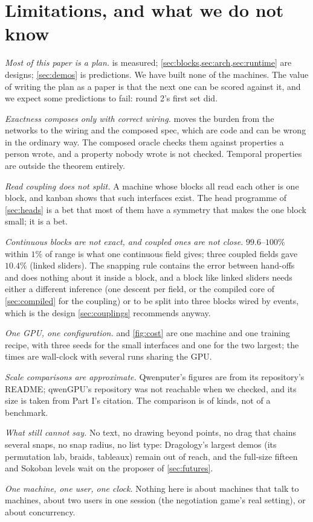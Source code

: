 \section{Limitations, and what we do not know}
\label{sec:limits}

\emph{Most of this paper is a plan.}  is measured; \cref{sec:blocks,sec:arch,sec:runtime} are
designs; \cref{sec:demos} is predictions. We have built none of the machines. The value of writing the plan as
a paper is that the next one can be scored against it, and we expect some predictions to fail: round 2's first
set did.

\emph{Exactness composes only with correct wiring.}  moves the burden from the networks to
the wiring and the composed spec, which are code and can be wrong in the ordinary way. The composed oracle
checks them against properties a person wrote, and a property nobody wrote is not checked. Temporal properties
are outside the theorem entirely.

\emph{Read coupling does not split.} A machine whose blocks all read each other is one block, and kanban shows
that such interfaces exist. The head programme of \cref{sec:heads} is a bet that most of them have a symmetry
that makes the one block small; it is a bet.

\emph{Continuous blocks are not exact, and coupled ones are not close.} $99.6$--$100\%$ within $1\%$ of range
is what one continuous field gives; three coupled fields gave $10.4\%$ (linked sliders). The snapping rule
contains the error between hand-offs and does nothing about it inside a block, and a block like linked sliders
needs either a different inference (one descent per field, or the compiled core of \cref{sec:compiled} for the
coupling) or to be split into three blocks wired by events, which is the design \cref{sec:couplings}
recommends anyway.

\emph{One GPU, one configuration.}  and \cref{fig:cost} are one machine and one training
recipe, with three seeds for the small interfaces and one for the two largest; the times are wall-clock with
several runs sharing the GPU.

\emph{Scale comparisons are approximate.} Qwenputer's figures are from its repository's README; qwenGPU's
repository was not reachable when we checked, and its size is taken from Part I's citation. The comparison is
of kinds, not of a benchmark.

\emph{What \method still cannot say.} No text, no drawing beyond points, no drag that chains several snaps,
no snap radius, no list type: Dragology's largest demos (its permutation lab, braids, tableaux) remain out of
reach, and the full-size fifteen and Sokoban levels wait on the proposer of \cref{sec:futures}.

\emph{One machine, one user, one clock.} Nothing here is about machines that talk to machines, about two
users in one session (the negotiation game's real setting), or about concurrency.
